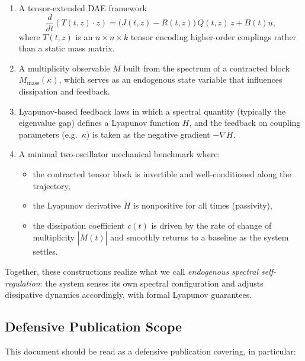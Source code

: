 \documentclass[11pt]{article}
\begin{document}
\begin{enumerate}[label=(\alph*)]
  \item A tensor-extended DAE framework
  \[
    \frac{d}{dt}\left(T(t,z)\cdot z\right)
    = \big(J(t,z) - R(t,z)\big)\,Q(t,z)\,z + B(t)u,
  \]
  where $T(t,z)$ is an $n\times n\times k$ tensor encoding higher-order couplings rather than a static mass matrix.

  \item A multiplicity observable $M$ built from the spectrum of a contracted block $M_{\text{mass}}(\kappa)$, which serves as an endogenous state variable that influences dissipation and feedback.

  \item Lyapunov-based feedback laws in which a spectral quantity (typically the eigenvalue gap) defines a Lyapunov function $H$, and the feedback on coupling parameters (e.g.\ $\kappa$) is taken as the negative gradient $-\nabla H$.

  \item A minimal two-oscillator mechanical benchmark where:
  \begin{itemize}
    \item the contracted tensor block is invertible and well-conditioned along the trajectory,
    \item the Lyapunov derivative $\dot H$ is nonpositive for all times (passivity),
    \item the dissipation coefficient $c(t)$ is driven by the rate of change of multiplicity $|\dot M(t)|$ and smoothly returns to a baseline as the system settles.
  \end{itemize}
\end{enumerate}

Together, these constructions realize what we call \emph{endogenous spectral self-regulation}: the system senses its own spectral configuration and adjusts dissipative dynamics accordingly, with formal Lyapunov guarantees.

\subsection{Defensive Publication Scope}

This document should be read as a defensive publication covering, in particular:
\end{document}
